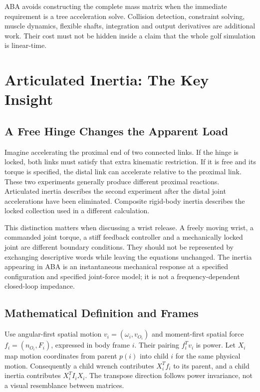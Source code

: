 ABA avoids constructing the complete mass matrix when the immediate requirement is a tree acceleration solve. Collision detection, constraint solving, muscle dynamics, flexible shafts, integration and output derivatives are additional work. Their cost must not be hidden inside a claim that the whole golf simulation is linear-time.

\section{Articulated Inertia: The Key Insight}
\label{sec:articulated_inertia}

\subsection{A Free Hinge Changes the Apparent Load}
\label{subsec:inertia_intuition}

Imagine accelerating the proximal end of two connected links. If the hinge is locked, both links must satisfy that extra kinematic restriction. If it is free and its torque is specified, the distal link can accelerate relative to the proximal link. These two experiments generally produce different proximal reactions. Articulated inertia describes the second experiment after the distal joint accelerations have been eliminated. Composite rigid-body inertia describes the locked collection used in a different calculation.

This distinction matters when discussing a wrist release. A freely moving wrist, a commanded joint torque, a stiff feedback controller and a mechanically locked joint are different boundary conditions. They should not be represented by exchanging descriptive words while leaving the equations unchanged. The inertia appearing in ABA is an instantaneous mechanical response at a specified configuration and specified joint-force model; it is not a frequency-dependent closed-loop impedance.

\subsection{Mathematical Definition and Frames}
\label{subsec:articulated_inertia_math}

Use angular-first spatial motion $v_i=(\omega_i,v_{O_i})$ and moment-first spatial force $f_i=(n_{O_i},F_i)$, expressed in body frame $i$. Their pairing $f_i^T v_i$ is power. Let $X_i$ map motion coordinates from parent $p(i)$ into child $i$ for the same physical motion. Consequently a child wrench contributes $X_i^T f_i$ to its parent, and a child inertia contributes $X_i^T I_i X_i$. The transpose direction follows power invariance, not a visual resemblance between matrices.

